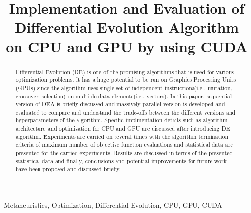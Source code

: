 \documentclass[conference]{IEEEtran}
\begin{document}
\title{Implementation and Evaluation of Differential Evolution Algorithm on CPU and GPU by using CUDA\\
}

\author{
}

\maketitle

\begin{abstract}
	Differential Evolution (DE) is one of the promising algorithms that is used for various optimization problems. It has a huge potential to be run on Graphics Processing Units (GPUs)
	since the algorithm uses single set of independent instructions(i.e., mutation, crossover, selection) on multiple data elements(i.e., vectors). In this paper, sequential version 
	of DEA is briefly discussed and massively parallel version is developed and evaluated to compare and understand the trade-offs between the different versions and hyperparameters of 
	the algorithm. Specific implmentation details such as algorithm architecture and optimization for CPU and GPU are discussed after introducing DE algorithm. Experiments are carried 
	on several times with the algorithm termination criteria of maximum number of objective function evaluations and statistical data are presented for the carried experiments.
	Results are discussed in terms of the presented statistical data and finally, conclusions and potential improvements for future work have been proposed and discussed briefly.
\end{abstract}

\begin{IEEEkeywords}
	Metaheuristics, Optimization, Differential Evolution, CPU, GPU, CUDA
\end{IEEEkeywords}
\end{document}
